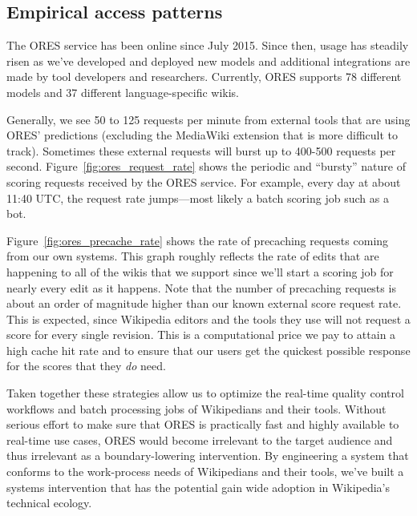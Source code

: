 \subsection{Empirical access patterns}


The ORES service has been online since July 2015\cite{halfaker2015artificial}.  Since then, usage has steadily risen as we've developed and deployed new models and additional integrations are made by tool developers and researchers.  Currently, ORES supports 78 different models and 37 different language-specific wikis.

Generally, we see 50 to 125 requests per minute from external tools that are using ORES' predictions (excluding the MediaWiki extension that is more difficult to track).  Sometimes these external requests will burst up to 400-500 requests per second.  Figure~\ref{fig:ores_request_rate} shows the periodic and ``bursty'' nature of scoring requests received by the ORES service.  For example, every day at about 11:40 UTC, the request rate jumps---most likely a batch scoring job such as a bot.

Figure~\ref{fig:ores_precache_rate} shows the rate of precaching requests coming from our own systems.  This graph roughly reflects the rate of edits that are happening to all of the wikis that we support since we'll start a scoring job for nearly every edit as it happens.  Note that the number of precaching requests is about an order of magnitude higher than our known external score request rate.  This is expected, since Wikipedia editors and the tools they use will not request a score for every single revision.  This is a computational price we pay to attain a high cache hit rate and to ensure that our users get the quickest possible response for the scores that they \emph{do} need.

Taken together these strategies allow us to optimize the real-time quality control workflows and batch processing jobs of Wikipedians and their tools.  Without serious effort to make sure that ORES is practically fast and highly available to real-time use cases, ORES would become irrelevant to the target audience and thus irrelevant as a boundary-lowering intervention.  By engineering a system that conforms to the work-process needs of Wikipedians and their tools, we've built a systems intervention that has the potential gain wide adoption in Wikipedia's technical ecology.

